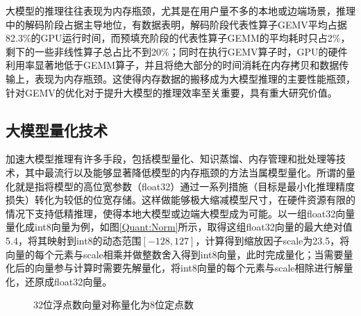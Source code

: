 大模型的推理往往表现为内存瓶颈，尤其是在用户量不多的本地或边端场景，推理中的解码阶段占据主导地位\cite{InferLinear}，有数据表明，解码阶段代表性算子GEMV平均占据82.3\%的GPU运行时间，而预填充阶段的代表性算子GEMM的平均耗时只占2\%，剩下的一些非线性算子总占比不到20\%；同时在执行GEMV算子时，GPU的硬件利用率显著地低于GEMM算子，并且将绝大部分的时间消耗在内存拷贝和数据传输上，表现为内存瓶颈\cite{SamsungHotChips}。这使得内存数据的搬移成为大模型推理的主要性能瓶颈，针对GEMV的优化对于提升大模型的推理效率至关重要，具有重大研究价值。

\subsection{大模型量化技术}
加速大模型推理有许多手段，包括模型量化、知识蒸馏、内存管理和批处理等技术\cite{LLMInferSurveyTsingHua}，其中最流行以及能够显著降低模型的内存瓶颈的方法当属模型量化。所谓的量化就是指将模型的高位宽参数（float32）通过一系列措施（目标是最小化推理精度损失）转化为较低的位宽存储。这样做能够极大缩减模型尺寸，在硬件资源有限的情况下支持低精推理，使得本地大模型或边端大模型成为可能。以一组float32向量量化成int8向量为例，如图\ref{Quant:Norm}所示，取得这组float32向量的最大绝对值5.4，将其映射到int8的动态范围$[-128,127]$，计算得到缩放因子scale为23.5，将向量的每个元素与scale相乘并做整数舍入得到int8向量，此时完成量化；当需要量化后的向量参与计算时需要先解量化，将int8向量的每个元素与scale相除进行解量化，还原成float32向量。

\begin{figure}[htbp!]
	\centering
	\caption{32位浮点数向量对称量化为8位定点数}
	\label{Quant}
\end{figure}

